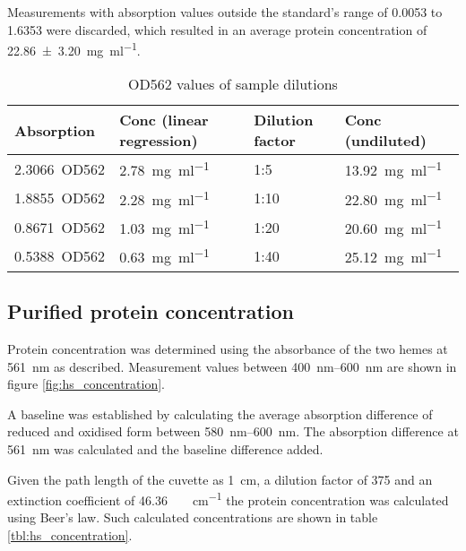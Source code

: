 Measurements with absorption values outside the standard's range of 0.0053 to
1.6353 were discarded, which resulted in an average protein concentration of
\SI{22.86 \pm 3.20}{\mg\per\ml}.

\begin{table*}
	\centering
	\begin{tabu}{llll}
		\toprule
		Absorption & Conc (linear regression) & Dilution factor & Conc (undiluted) \\
		\midrule
		\SI{2.3066}{OD562} & \SI{2.78}{\mg\per\ml} & 1:5  & \SI{13.92}{\mg\per\ml} \\
		\SI{1.8855}{OD562} & \SI{2.28}{\mg\per\ml} & 1:10 & \SI{22.80}{\mg\per\ml} \\
		\SI{0.8671}{OD562} & \SI{1.03}{\mg\per\ml} & 1:20 & \SI{20.60}{\mg\per\ml} \\
		\SI{0.5388}{OD562} & \SI{0.63}{\mg\per\ml} & 1:40 & \SI{25.12}{\mg\per\ml} \\
		\bottomrule
	\end{tabu}
	\caption{OD562 values of sample dilutions}
	\label{tbl:bca_absorption_sample}
\end{table*}

\subsection{Purified protein concentration}

Protein concentration was determined using the absorbance of the two hemes at
\SI{561}{\nm} as described. Measurement values between \SIrange{400}{600}{\nm}
are shown in figure \ref{fig:hs_concentration}.

A baseline was established by calculating the average absorption difference of
reduced and oxidised form between \SIrange{580}{600}{\nm}. The absorption
difference at \SI{561}{\nm} was calculated and the baseline difference added.

Given the path length of the cuvette as \SI{1}{\cm}, a dilution factor of 375
and an extinction coefficient of \SI{46.36}{\per\milli\Molar\per\cm} the
protein concentration was calculated using Beer's law. Such calculated
concentrations are shown in table \ref{tbl:hs_concentration}.

